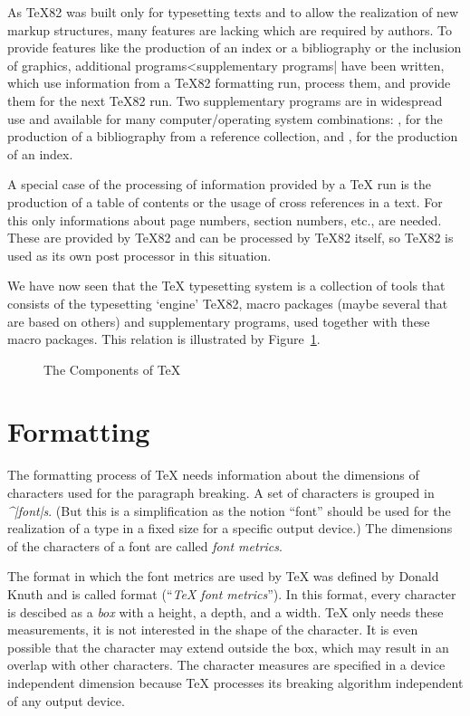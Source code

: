 As \TeX82 was built only for typesetting texts and to allow the
realization of new markup structures, many features are lacking which are
required by authors. To provide features like the production of
an index or a bibliography or the inclusion of graphics, additional
programs^^|supplementary programs| have been written, which use 
information from a \TeX82 formatting run, process them, and provide
them for the next \TeX82 run. Two supplementary programs are
in widespread use and available for many computer/operating system
combinations: \BibTeX{}, for the production of a bibliography from a
reference collection, and \MakeIndex{}, for the production of an index.

A special case of the processing of information provided by a \TeX{}
run is the production of a table of contents or the usage of cross
references in a text. For this only informations about page numbers,
section numbers, etc., are needed. These are
provided by \TeX82 and can be processed by \TeX82 itself, so \TeX82 is
used as its own post processor in this situation.

We have now seen that the \TeX{} typesetting system  is
a collection of tools that consists of the typesetting `engine' \TeX82,
macro packages (maybe several that are based on others) and
supplementary programs, used together with these macro packages.
This relation is illustrated by Figure~\ref{fig:components}.

\begin{figure}
\begin{center}

\caption{The Components of \TeX{}}
\label{fig:components}
\end{center}
\end{figure}



\section{Formatting}

The formatting process of \TeX{} needs information about the
dimensions of characters used for the paragraph breaking. A set
of characters is grouped in {\it ^|font|s}. (But this is a
simplification as the notion ``font'' should be used for the
realization of a type in a fixed size for a specific output device.)
The dimensions of the characters of a font are called {\it font
metrics}.


The format in which the font metrics are used by \TeX{} was
defined by {\sc Donald Knuth} and is called   format
(``{\sl \TeX{} font metrics\/}''). In this format, every character is
descibed as a {\it box\/} with a height, a depth, and a width.
\TeX{} only needs these measurements, it is not interested in the shape
of the character. It is even possible that the character may extend
outside 
the box, which may result in an overlap with other characters.
The character measures are specified in a device independent
dimension because \TeX{} processes its breaking algorithm
independent of any output device.

